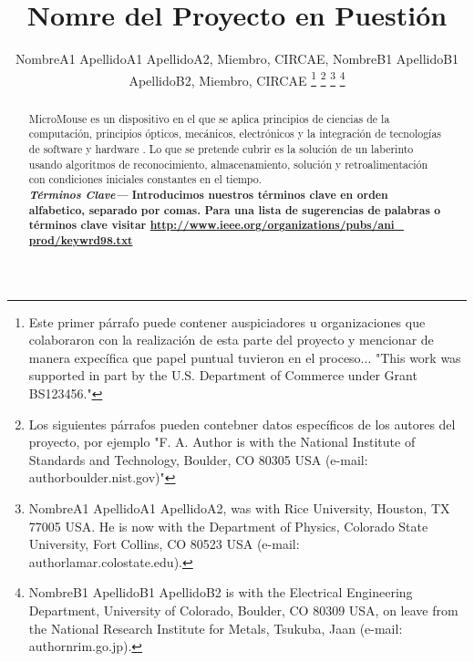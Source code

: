 \documentclass[a4paper]{IEEEtran} %
\providecommand{\keywords}[1]{\textbf{\textit{Términos Clave---}} #1}
\begin{document}

\title{Nomre del Proyecto en Puestión}
\author{NombreA1 ApellidoA1 ApellidoA2, Miembro, CIRCAE, NombreB1 ApellidoB1 ApellidoB2, Miembro, CIRCAE
\thanks{Este primer párrafo puede contener auspiciadores u organizaciones que colaboraron con la realización de esta parte del proyecto y mencionar de manera expecífica que papel puntual tuvieron en el proceso... "This work was supported in part by the U.S. Department of Commerce under Grant BS123456."}
\thanks{Los siguientes párrafos pueden contebner datos específicos de los autores del proyecto, por ejemplo "F. A. Author is with the National Institute of Standards and Technology, Boulder, CO 80305 USA (e-mail: author\@ boulder.nist.gov)"}
\thanks{NombreA1 ApellidoA1 ApellidoA2, was with Rice University, Houston, TX 77005 USA. He is now with the Department of Physics, Colorado State University, Fort Collins, CO 80523 USA (e-mail: author\@ lamar.colostate.edu).}
\thanks{NombreB1 ApellidoB1 ApellidoB2 is with the Electrical Engineering Department, University of Colorado, Boulder, CO 80309 USA, on leave from the National Research Institute for Metals, Tsukuba, Jaan (e-mail: author\@ nrim.go.jp).}}

\maketitle


\begin{abstract}
MicroMouse es un dispositivo en el que se aplica principios de ciencias de la computación, principios ópticos, mecánicos, electrónicos y la integración de tecnologías de software y hardware \cite{libro1} . Lo que se pretende cubrir es la solución de un laberinto usando algoritmos de reconocimiento, almacenamiento, solución y retroalimentación con condiciones iniciales constantes en el tiempo.\\

\keywords{\textbf{Introducimos nuestros términos clave en orden alfabetico, separado por comas. Para una lista de sugerencias de palabras o términos clave visitar \underline{http://www.ieee.org/organizations/pubs/ani\_ prod/keywrd98.txt}}}
\end{abstract}

\end{document}
